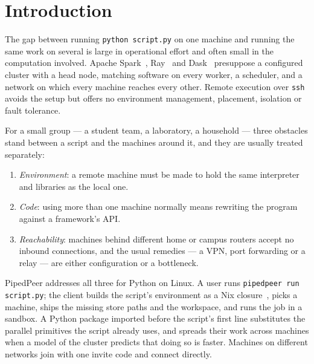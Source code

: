 \documentclass[5p,times,twocolumn]{elsarticle}
\begin{document}
\section{Introduction}
\label{sec:intro}

The gap between running \texttt{python script.py} on one machine and running
the same work on several is large in operational effort and often small in the
computation involved. Apache Spark~\cite{zaharia2010spark},
Ray~\cite{moritz2018ray} and Dask~\cite{rocklin2015dask} presuppose a configured
cluster with a head node, matching software on every worker, a scheduler, and a
network on which every machine reaches every other. Remote execution over
\texttt{ssh} avoids the setup but offers no environment management, placement,
isolation or fault tolerance.

For a small group --- a student team, a laboratory, a household --- three
obstacles stand between a script and the machines around it, and they are
usually treated separately:
\begin{enumerate}
\item \emph{Environment}: a remote machine must be made to hold the same
interpreter and libraries as the local one.
\item \emph{Code}: using more than one machine normally means rewriting the
program against a framework's API.
\item \emph{Reachability}: machines behind different home or campus routers
accept no inbound connections, and the usual remedies --- a VPN, port
forwarding or a relay --- are either configuration or a bottleneck.
\end{enumerate}

PipedPeer addresses all three for Python on Linux. A user runs
\texttt{pipedpeer run script.py}; the client builds the script's environment as
a Nix closure~\cite{dolstra2004nix}, picks a machine, ships the missing store
paths and the workspace, and runs the job in a sandbox. A Python package
imported before the script's first line substitutes the parallel primitives the
script already uses, and spreads their work across machines when a model of
the cluster predicts that doing so is faster. Machines on different networks
join with one invite code and connect directly.
\end{document}
